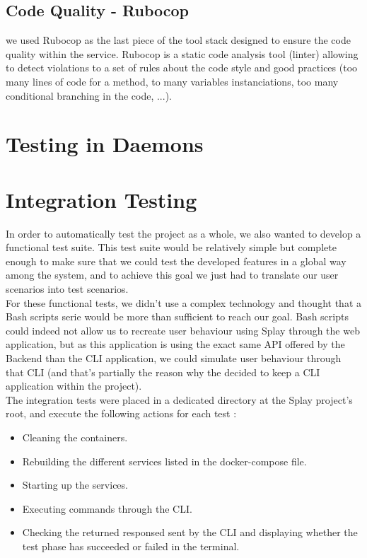 \documentclass{eplmastersthesis}
\begin{document}
      \subsection{Code Quality - Rubocop}

        we used Rubocop as the last piece of the tool stack designed to ensure
        the code quality within the service. Rubocop is a static code analysis
        tool (linter) allowing to detect violations to a set of rules about
        the code style and good practices (too many lines of code for a method,
        to many variables instanciations, too many conditional branching
        in the code, ...).

    \section{Testing in Daemons}


    \section{Integration Testing}

      In order to automatically test the project as a whole, we also wanted to
      develop a functional test suite. This test suite would be relatively
      simple but complete enough to make sure that we could test the developed
      features in a global way among the system, and to achieve this goal we
      just had to translate our user scenarios into test scenarios.\\

      For these functional tests, we didn't use a complex technology and
      thought that a Bash scripts serie would be more than sufficient to
      reach our goal. Bash scripts could indeed not allow us to recreate user
      behaviour using Splay through the web application, but as this
      application is using the exact same API offered by the Backend than the
      CLI application, we could simulate user behaviour through that CLI (and
      that's partially the reason why the decided to keep a CLI application
      within the project).\\

      The integration tests were placed in a dedicated directory at the Splay
      project's root, and execute the following actions for each test :

      \begin{itemize}
        \item Cleaning the containers.
        \item Rebuilding the different services listed in the docker-compose
        file.
        \item Starting up the services.
        \item Executing commands through the CLI.
        \item Checking the returned responsed sent by the CLI and displaying
        whether the test phase has succeeded or failed in the terminal.
      \end{itemize}
\end{document}
